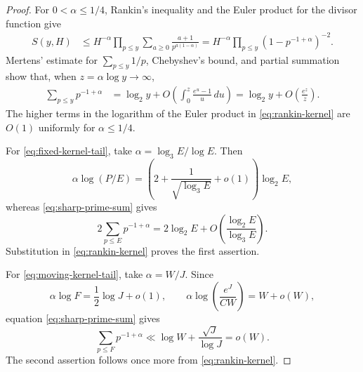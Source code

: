 \documentclass[11pt]{article}
\theoremstyle{remark}
\newcommand{\1}{\mathbf 1}
\begin{document}
\begin{proof}
For $0<\alpha\leq1/4$, Rankin's inequality and the Euler product for the
divisor function give
\begin{align}
 S(y,H)
 &\leq H^{-\alpha}
       \prod_{p\leq y}\sum_{a\geq0}
                \frac{a+1}{p^{a(1-\alpha)}}
  =H^{-\alpha}
       \prod_{p\leq y}(1-p^{-1+\alpha})^{-2}.
 \label{eq:rankin-kernel}
\end{align}
Mertens' estimate for $\sum_{p\leq y}1/p$, Chebyshev's bound, and partial
summation show that, when $z=\alpha\log y\to\infty$,
\begin{align}
 \sum_{p\leq y}p^{-1+\alpha}
 &=\log_2y+
   O\left(\int_0^z\frac{e^u-1}{u}\,du\right)
  =\log_2y+O\left(\frac{e^z}{z}\right).
 \label{eq:sharp-prime-sum}
\end{align}
The higher terms in the logarithm of the Euler product in
\eqref{eq:rankin-kernel} are $O(1)$ uniformly for $\alpha\leq1/4$.

For \eqref{eq:fixed-kernel-tail}, take
$\alpha=\log_3E/\log E$.  Then
\[
 \alpha\log(P/E)
 =\left(2+\frac1{\sqrt{\log_3E}}+o(1)\right)\log_2E,
\]
whereas \eqref{eq:sharp-prime-sum} gives
\[
 2\sum_{p\leq E}p^{-1+\alpha}
 =2\log_2E+O\left(\frac{\log_2E}{\log_3E}\right).
\]
Substitution in \eqref{eq:rankin-kernel} proves the first assertion.

For \eqref{eq:moving-kernel-tail}, take $\alpha=W/J$.  Since
\[
 \alpha\log F=\frac12\log J+o(1),
 \qquad
 \alpha\log\left(\frac{e^J}{CW}\right)=W+o(W),
\]
equation \eqref{eq:sharp-prime-sum} gives
\[
 \sum_{p\leq F}p^{-1+\alpha}
 \ll\log W+\frac{\sqrt J}{\log J}=o(W).
\]
The second assertion follows once more from \eqref{eq:rankin-kernel}.
\end{proof}
\end{document}
